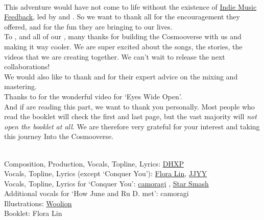 
\phantom{*}\\

This adventure would have not come to life without the existence of \href{https://indiemusicfeedback.com}{Indie Music Feedback}, led by  and . So we want to thank all  for the encouragement they offered, and for the fun they are bringing to our lives.\\

To ,  and all of our , many thanks for building the Cosmooverse with us and making it way cooler. We are super excited about the songs, the stories, the videos that we are creating together. We can't wait to release the next collaborations!\\

We would also like to thank  and  for their expert advice on the mixing and mastering.\\

Thanks to  for the wonderful video for `Eyes Wide Open'.\\

And if  are reading this part, we want to thank you personally. Most people who read the booklet will check the first and last page, but the vast majority will \emph{not open the booklet at all}. We are therefore very grateful for your interest and taking this journey Into the Cosmooverse.

\clearpage



\phantom{*}\\
Composition, Production, Vocals, Topline, Lyrics: \href{https://linktr.ee/dhxp}{DHXP}\\
Vocals, Topline, Lyrics (except `Conquer You'): \href{https://www.youtube.com/channel/UC7pM7YKe9U1D1Xl4s_xroBw}{Flora Lin}, \href{https://soundcloud.com/okfeather}{JJYY} \\
Vocals, Topline, Lyrics for `Conquer You': \href{https://www.camoragi.com/}{camoragi} , \href{https://soundcloud.com/starsmashofficial}{Star Smash} \\
Additional vocals for `How June and Ru D. met': camoragi\\
Illustrations: \href{https://twitter.com/wooliondraws}{Woolion}\\
Booklet: Flora Lin

